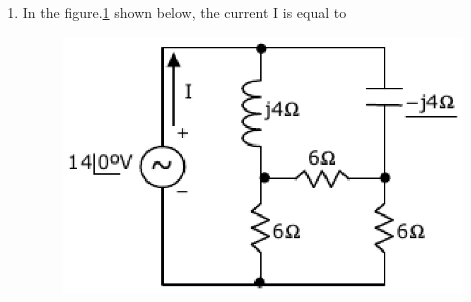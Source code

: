 \documentclass[journal,12pt,twocolumn]{IEEEtran}
\begin{document}
\begin{enumerate}
\item In the figure.\ref{fig82} shown below, the current I is equal to
\begin{enumerate}
\setlength\itemsep{2em}
\begin{figure}[!h]
\begin{center}
\includegraphics[scale=0.7]{./figs/fig82.eps}
\caption{}
\label{fig82}
\end{center}
\end{figure}
\end{enumerate}


\end{enumerate}
\end{document}
